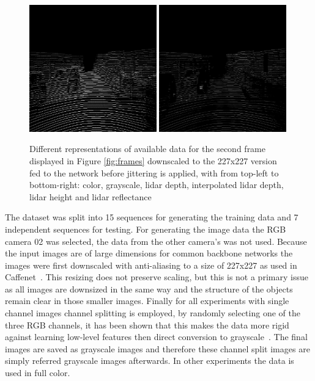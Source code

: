 \begin{figure}
\includegraphics[width=0.49\textwidth]{images/lidar_height.png}
\includegraphics[width=0.49\textwidth]{images/lidar_refl.png}
\caption{Different representations of available data for the second frame displayed in Figure \ref{fig:frames} downscaled to the 227x227 version fed to the network before jittering is applied, with from top-left to bottom-right: color, grayscale, lidar depth, interpolated lidar depth, lidar height and lidar reflectance}
\label{fig:features}
\end{figure}

The dataset was split into 15 sequences for generating the training data and 7 independent sequences for testing. For generating the image data the RGB camera 02 was selected, the data from the other camera's was not used. Because the input images are of large dimensions for common backbone networks the images were first downscaled with anti-aliasing to a size of 227x227 as used in Caffenet~\cite{jia2014}. This resizing does not preserve scaling, but this is not a primary issue as all images are downsized in the same way and the structure of the objects remain clear in those smaller images. Finally for all experiments with single channel images channel splitting is employed, by randomly selecting one of the three RGB channels, it has been shown that this makes the data more rigid against learning low-level features then direct conversion to grayscale~\cite{lee2017}. The final images are saved as grayscale images and therefore these channel split images are simply referred grayscale images afterwards. In other experiments the data is used in full color.


